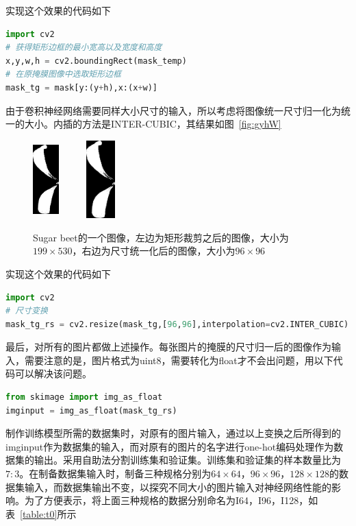 实现这个效果的代码如下
\begin{lstlisting}[language=python]
import cv2
# 获得矩形边框的最小宽高以及宽度和高度
x,y,w,h = cv2.boundingRect(mask_temp)
# 在原掩膜图像中选取矩形边框
mask_tg = mask[y:(y+h),x:(x+w)]
\end{lstlisting}
由于卷积神经网络需要同样大小尺寸的输入，所以考虑将图像统一尺寸归一化为统一的大小。内插的方法是INTER-CUBIC，其结果如图~\ref{fig:gyhW}

\begin{figure}[htbp]
\centering 
\includegraphics[width=10mm,height=30mm]{../figures/Sugar_beet_1bdfd2206_mask_tg.png} 	
\includegraphics[width=30mm,height=30mm]{../figures/Sugar_beet_1bdfd2206_mask_tg.png} 	\\
\caption{Sugar beet的一个图像，左边为矩形裁剪之后的图像，大小为$199\times 530$，右边为尺寸统一化后的图像，大小为$96\times 96$}
\label{fig:gyh}
\end{figure}

实现这个效果的代码如下
\begin{lstlisting}[language=python]
import cv2
# 尺寸变换
mask_tg_rs = cv2.resize(mask_tg,[96,96],interpolation=cv2.INTER_CUBIC)
\end{lstlisting}
最后，对所有的图片都做上述操作。每张图片的掩膜的尺寸归一后的图像作为输入，需要注意的是，图片格式为uint8，需要转化为float才不会出问题，用以下代码可以解决该问题。
\begin{lstlisting}[language=python]
from skimage import img_as_float
imginput = img_as_float(mask_tg_rs) 
\end{lstlisting}

制作训练模型所需的数据集时，对原有的图片输入，通过以上变换之后所得到的imginput作为数据集的输入，而对原有的图片的名字进行one-hot编码处理作为数据集的输出。采用自助法分割训练集和验证集。训练集和验证集的样本数量比为$7:3$。在制备数据集输入时，制备三种规格分别为$64\times64$，$96\times96$，$128\times128$的数据集输入，而数据集输出不变，以探究不同大小的图片输入对神经网络性能的影响。为了方便表示，将上面三种规格的数据分别命名为I64，I96，I128，如表~\ref{table:t0}所示



